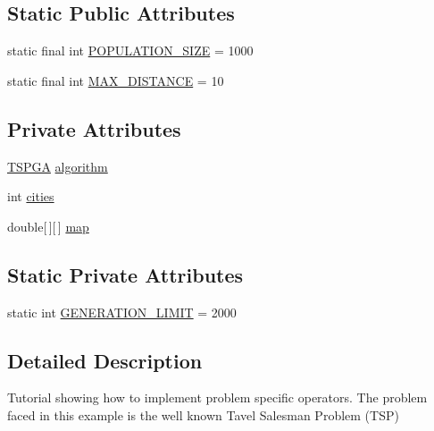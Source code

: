 \subsection*{Static Public Attributes}
\begin{DoxyCompactItemize}
\item 
static final int \hyperlink{classjenes_1_1tutorials_1_1problem3_1_1_travel_salesman_problem_afda171e13788bcb67f73fd82bd89498b}{P\-O\-P\-U\-L\-A\-T\-I\-O\-N\-\_\-\-S\-I\-Z\-E} = 1000
\item 
static final int \hyperlink{classjenes_1_1tutorials_1_1problem3_1_1_travel_salesman_problem_a94747a5d97d1f3974d74a27e641285c8}{M\-A\-X\-\_\-\-D\-I\-S\-T\-A\-N\-C\-E} = 10
\end{DoxyCompactItemize}
\subsection*{Private Attributes}
\begin{DoxyCompactItemize}
\item 
\hyperlink{classjenes_1_1tutorials_1_1problem3_1_1_t_s_p_g_a}{T\-S\-P\-G\-A} \hyperlink{classjenes_1_1tutorials_1_1problem3_1_1_travel_salesman_problem_a48d702f266e2d1cf065a3e1674d3f9ca}{algorithm}
\item 
int \hyperlink{classjenes_1_1tutorials_1_1problem3_1_1_travel_salesman_problem_af256e6139f6148cb3d585c54684321a1}{cities}
\item 
double\mbox{[}$\,$\mbox{]}\mbox{[}$\,$\mbox{]} \hyperlink{classjenes_1_1tutorials_1_1problem3_1_1_travel_salesman_problem_a44794d38e04e405daa3b78f1c838a167}{map}
\end{DoxyCompactItemize}
\subsection*{Static Private Attributes}
\begin{DoxyCompactItemize}
\item 
static int \hyperlink{classjenes_1_1tutorials_1_1problem3_1_1_travel_salesman_problem_acc389d21c65ac25614a59cee47a08ae9}{G\-E\-N\-E\-R\-A\-T\-I\-O\-N\-\_\-\-L\-I\-M\-I\-T} = 2000
\end{DoxyCompactItemize}


\subsection{Detailed Description}
Tutorial showing how to implement problem specific operators. The problem faced in this example is the well known Tavel Salesman Problem (T\-S\-P)

